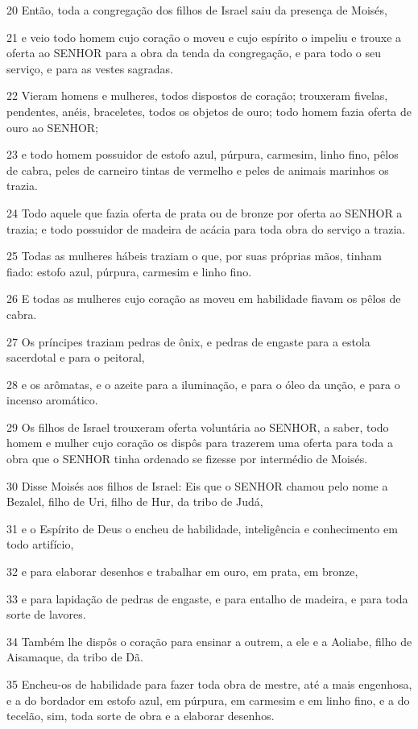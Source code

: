 \par 20 Então, toda a congregação dos filhos de Israel saiu da presença de Moisés,
\par 21 e veio todo homem cujo coração o moveu e cujo espírito o impeliu e trouxe a oferta ao SENHOR para a obra da tenda da congregação, e para todo o seu serviço, e para as vestes sagradas.
\par 22 Vieram homens e mulheres, todos dispostos de coração; trouxeram fivelas, pendentes, anéis, braceletes, todos os objetos de ouro; todo homem fazia oferta de ouro ao SENHOR;
\par 23 e todo homem possuidor de estofo azul, púrpura, carmesim, linho fino, pêlos de cabra, peles de carneiro tintas de vermelho e peles de animais marinhos os trazia.
\par 24 Todo aquele que fazia oferta de prata ou de bronze por oferta ao SENHOR a trazia; e todo possuidor de madeira de acácia para toda obra do serviço a trazia.
\par 25 Todas as mulheres hábeis traziam o que, por suas próprias mãos, tinham fiado: estofo azul, púrpura, carmesim e linho fino.
\par 26 E todas as mulheres cujo coração as moveu em habilidade fiavam os pêlos de cabra.
\par 27 Os príncipes traziam pedras de ônix, e pedras de engaste para a estola sacerdotal e para o peitoral,
\par 28 e os arômatas, e o azeite para a iluminação, e para o óleo da unção, e para o incenso aromático.
\par 29 Os filhos de Israel trouxeram oferta voluntária ao SENHOR, a saber, todo homem e mulher cujo coração os dispôs para trazerem uma oferta para toda a obra que o SENHOR tinha ordenado se fizesse por intermédio de Moisés.
\par 30 Disse Moisés aos filhos de Israel: Eis que o SENHOR chamou pelo nome a Bezalel, filho de Uri, filho de Hur, da tribo de Judá,
\par 31 e o Espírito de Deus o encheu de habilidade, inteligência e conhecimento em todo artifício,
\par 32 e para elaborar desenhos e trabalhar em ouro, em prata, em bronze,
\par 33 e para lapidação de pedras de engaste, e para entalho de madeira, e para toda sorte de lavores.
\par 34 Também lhe dispôs o coração para ensinar a outrem, a ele e a Aoliabe, filho de Aisamaque, da tribo de Dã.
\par 35 Encheu-os de habilidade para fazer toda obra de mestre, até a mais engenhosa, e a do bordador em estofo azul, em púrpura, em carmesim e em linho fino, e a do tecelão, sim, toda sorte de obra e a elaborar desenhos.


